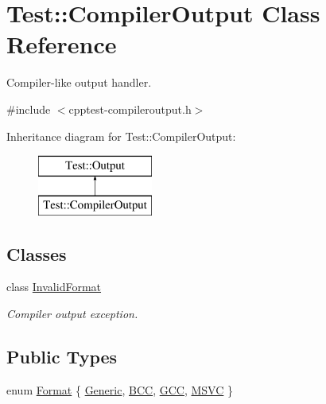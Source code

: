 \hypertarget{class_test_1_1_compiler_output}{}\section{Test\+:\+:Compiler\+Output Class Reference}
\label{class_test_1_1_compiler_output}


Compiler-\/like output handler.  




{\ttfamily \#include $<$cpptest-\/compileroutput.\+h$>$}

Inheritance diagram for Test\+:\+:Compiler\+Output\+:\begin{figure}[H]
\begin{center}
\leavevmode
\includegraphics[height=2.000000cm]{class_test_1_1_compiler_output}
\end{center}
\end{figure}
\subsection*{Classes}
\begin{DoxyCompactItemize}
\item 
class \hyperlink{class_test_1_1_compiler_output_1_1_invalid_format}{Invalid\+Format}
\begin{DoxyCompactList}\small\item\em Compiler output exception. \end{DoxyCompactList}\end{DoxyCompactItemize}
\subsection*{Public Types}
\begin{DoxyCompactItemize}
\item 
enum \hyperlink{class_test_1_1_compiler_output_ab34cf506804cefbc67545a256af196ff}{Format} \{ \hyperlink{class_test_1_1_compiler_output_ab34cf506804cefbc67545a256af196ffa1a83926858dfb1bab06bc0a313a49dac}{Generic}, 
\hyperlink{class_test_1_1_compiler_output_ab34cf506804cefbc67545a256af196ffa9ad6dc16df2c992e8b77a3f6ee2247d8}{B\+CC}, 
\hyperlink{class_test_1_1_compiler_output_ab34cf506804cefbc67545a256af196ffa7d077829f643d60a87a022d39989dd3b}{G\+CC}, 
\hyperlink{class_test_1_1_compiler_output_ab34cf506804cefbc67545a256af196ffae4f7af0eaa05253ea35484384deeb86b}{M\+S\+VC}
 \}
\end{DoxyCompactItemize}
